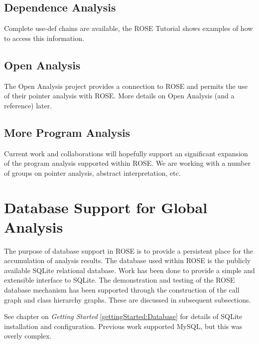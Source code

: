 \subsection{Dependence Analysis}

   Complete use-def chains are available, the ROSE Tutorial shows examples of
how to access this information.

\subsection{Open Analysis}

   The Open Analysis project provides a connection to ROSE and permits
the use of their pointer analysis with ROSE.  More details on Open Analysis
(and a reference) later.

\subsection{More Program Analysis}

   Current work and collaborations will hopefully support an significant 
expansion of the program analysis supported within ROSE.  We are working with
a number of groups on pointer analysis, abstract interpretation, etc.

\section{Database Support for Global Analysis}
\label{RoseExamples:RoseTutorial:Database}

   The purpose of database support in ROSE is to provide a persistent
place for the accumulation of analysis results.  The database used within ROSE
is the publicly available SQLite relational database.  Work has
been done to provide a simple and extensible interface to SQLite.  The 
demonstration and testing of the ROSE database mechanism has been supported 
through the construction of the call graph and class hierarchy graphs. These
are discussed in subsequent subsections.

See chapter on {\em Getting Started} \ref{gettingStarted:Database}
for details of SQLite installation and configuration.  Previous work
supported MySQL, but this was overly complex.

